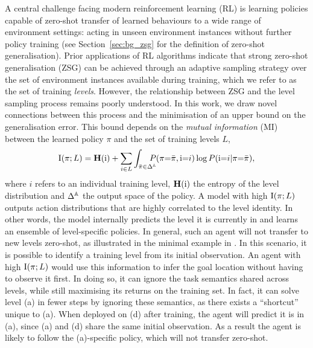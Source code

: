 A central challenge facing modern reinforcement learning (RL) is learning policies capable of zero-shot transfer of learned behaviours to a wide range of environment settings: acting in unseen environment instances without further policy training (see Section~\ref{sec:bg_zsg} for the definition of zero-shot generalisation). Prior applications of RL algorithms \citep{rubiks,CLrobloc,fastCLrobloc} indicate that strong zero-shot generalisation (ZSG) can be achieved through an adaptive sampling strategy over the set of environment instances available during training, which we refer to as the set of training \textit{levels}. However, the relationship between ZSG and the level sampling process remains poorly understood. In this work, we draw novel connections between this process and the minimisation of an upper bound on the generalisation error. This bound depends on the \textit{mutual information} (MI) between the learned policy $\pi$ and the set of training levels $L$,
\begin{equation} \label{c3:eq:MI}
\noindent
    \mut{\pi}{L} = \entropy(\ri) + \sum_{i\in L} \int_{\bar{\pi} \in \Delta^\sA}\hspace{-1em} P(\pi{=}\bar{\pi}, \ri{=}i) \log P(\ri{=}i |\pi{=}\bar{\pi}),
\end{equation}
where $i$ refers to an individual training level, $\mathbf{H}({\textnormal{i}})$ the entropy of the level distribution and $\Delta^{\mathbb{A}}$ the output space of the policy. A model with high $\text{I}(\pi;L)$ outputs action distributions that are highly correlated to the level identity. In other words, the model internally predicts the level it is currently in and learns an ensemble of level-specific policies. In general, such an agent will not transfer to new levels zero-shot, as illustrated in the minimal example in . In this scenario, it is possible to identify a training level from its initial observation. An agent with high $\text{I}(\pi;L)$ would use this information to infer the goal location without having to observe it first. In doing so, it can ignore the task semantics shared across levels, while still maximising its returns on the training set. In fact, it can solve level (a) in fewer steps by ignoring these semantics, as there exists a ``shortcut'' unique to (a). When deployed on (d) after training, the agent will predict it is in (a), since (a) and (d) share the same initial observation. As a result the agent is likely to follow the (a)-specific policy, which will not transfer zero-shot.

